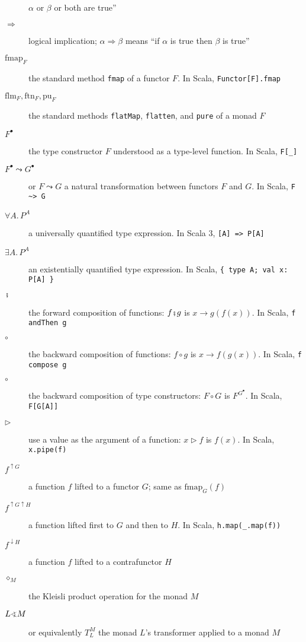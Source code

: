 \begin{description}
$\alpha$ or $\beta$ or both are true\textsf{''}
\item [{$\Rightarrow$}] logical implication; $\alpha\Rightarrow\beta$
means \textsf{``}if $\alpha$ is true then $\beta$ is true\textsf{''}
\item [{$\text{fmap}_{F}$}] the standard method \lstinline!fmap! of a
functor $F$. In Scala, \lstinline!Functor[F].fmap!
\item [{$\text{flm}_{F},\text{ftn}_{F},\text{pu}_{F}$}] the standard methods
\lstinline!flatMap!, \lstinline!flatten!, and \lstinline!pure!
of a monad $F$
\item [{$F^{\bullet}$}] the type constructor $F$ understood as a type-level
function. In Scala, \lstinline!F[_]! 
\item [{$F^{\bullet}\leadsto G^{\bullet}$}] or $F\leadsto G$ a natural
transformation between functors $F$ and $G$. In Scala, \lstinline!F ~> G!
\item [{$\forall A.\,P^{A}$}] a universally quantified type expression.
In Scala 3, \lstinline![A] => P[A]!
\item [{$\exists A.\,P^{A}$}] an existentially quantified type expression.
In Scala, \lstinline!{ type A; val x: P[A] }! 
\item [{$\bef$}] the forward composition of functions: $f\bef g$ is $x\rightarrow g(f(x))$.
In Scala, \lstinline!f andThen g!
\item [{$\circ$}] the backward composition of functions: $f\circ g$ is
$x\rightarrow f(g(x))$. In Scala, \lstinline!f compose g!
\item [{$\circ$}] the backward composition of type constructors: $F\circ G$
is $F^{G^{\bullet}}$. In Scala, \lstinline!F[G[A]]! 
\item [{$\triangleright$}] use a value as the argument of a function:
$x\triangleright f$ is $f(x)$. In Scala, \lstinline!x.pipe(f)!
\item [{$f^{\uparrow G}$}] a function $f$ lifted to a functor $G$; same
as $\text{fmap}_{G}(f)$
\item [{$f^{\uparrow G\uparrow H}$}] a function lifted first to $G$ and
then to $H$. In Scala, \lstinline!h.map(_.map(f))! 
\item [{$f^{\downarrow H}$}] a function $f$ lifted to a contrafunctor
$H$ 
\item [{$\diamond_{M}$}] the Kleisli product operation for the monad $M$
\item [{$L\varangle M$}] or equivalently $T_{L}^{M}$ \textemdash{} the
monad $L$\textsf{'}s transformer applied to a monad $M$

\end{description}
